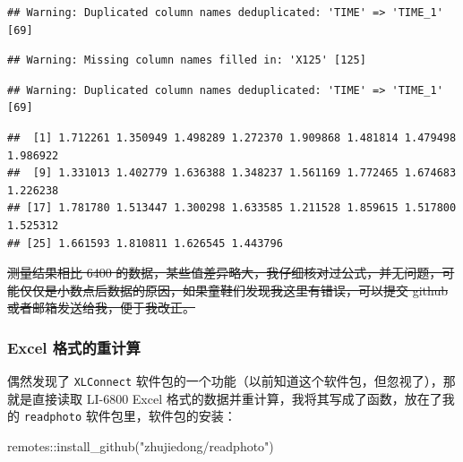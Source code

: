 \documentclass[
]{krantz}
\makeatletter
\newenvironment{Shaded}{\begin{snugshade}}{\end{snugshade}}
\newcommand{\FunctionTok}[1]{\textcolor[rgb]{0.00,0.00,0.00}{#1}}
\newcommand{\NormalTok}[1]{#1}
\newcommand{\SpecialCharTok}[1]{\textcolor[rgb]{0.00,0.00,0.00}{#1}}
\newcommand{\StringTok}[1]{\textcolor[rgb]{0.31,0.60,0.02}{#1}}
\newenvironment{kframe}{%
\medskip{}
\setlength{\fboxsep}{.8em}
 \def\at@end@of@kframe{}%
 \ifinner\ifhmode%
  \def\at@end@of@kframe{\end{minipage}}%
  \begin{minipage}{\columnwidth}%
 \fi\fi%
 \def\FrameCommand##1{\hskip\@totalleftmargin \hskip-\fboxsep
 \colorbox{shadecolor}{##1}\hskip-\fboxsep
     \hskip-\linewidth \hskip-\@totalleftmargin \hskip\columnwidth}%
 \MakeFramed {\advance\hsize-\width
   \@totalleftmargin\z@ \linewidth\hsize
   \@setminipage}}%
 {\par\unskip\endMakeFramed%
 \at@end@of@kframe}
\renewenvironment{Shaded}{\begin{kframe}}{\end{kframe}}
\makeatother
\begin{document}
\begin{verbatim}
## Warning: Duplicated column names deduplicated: 'TIME' => 'TIME_1' [69]
\end{verbatim}

\begin{verbatim}
## Warning: Missing column names filled in: 'X125' [125]
\end{verbatim}

\begin{verbatim}
## Warning: Duplicated column names deduplicated: 'TIME' => 'TIME_1' [69]
\end{verbatim}

\begin{Shaded}
\end{Shaded}

\begin{verbatim}
##  [1] 1.712261 1.350949 1.498289 1.272370 1.909868 1.481814 1.479498 1.986922
##  [9] 1.331013 1.402779 1.636388 1.348237 1.561169 1.772465 1.674683 1.226238
## [17] 1.781780 1.513447 1.300298 1.633585 1.211528 1.859615 1.517800 1.525312
## [25] 1.661593 1.810811 1.626545 1.443796
\end{verbatim}

\sout{测量结果相比 6400 的数据，某些值差异略大，我仔细核对过公式，并无问题，可能仅仅是小数点后数据的原因，如果童鞋们发现我这里有错误，可以提交 github 或者邮箱发送给我，便于我改正。}

\hypertarget{excel-recompute-68}{%
\subsubsection{Excel 格式的重计算}\label{excel-recompute-68}}

偶然发现了 \texttt{XLConnect} 软件包的一个功能（以前知道这个软件包，但忽视了），那就是直接读取 LI-6800 Excel 格式的数据并重计算，我将其写成了函数，放在了我的 \texttt{readphoto} 软件包里，软件包的安装：

\begin{Shaded}
\begin{Highlighting}[]
\NormalTok{remotes}\SpecialCharTok{::}\FunctionTok{install\_github}\NormalTok{(}\StringTok{"zhujiedong/readphoto"}\NormalTok{)}
\end{Highlighting}
\end{Shaded}
\end{document}
